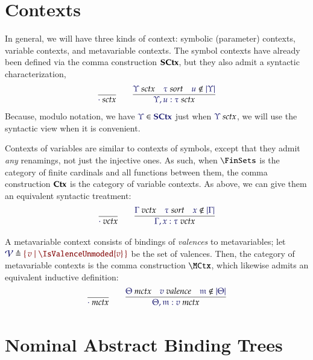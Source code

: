 \documentclass[11pt]{article}
\theoremstyle{definition}
\theoremstyle{remark}
\numberwithin{equation}{section}
\begin{document}
\section{Contexts}

In general, we will have three kinds of context: symbolic (parameter) contexts,
variable contexts, and metavariable contexts. The symbol contexts have already
been defined via the comma construction $\mathbf{SCtx}$, but they also admit a
syntactic characterization,
\begin{gather*}
  \infer{
    \IsSymCtx{\cdot}
  }{
  }
\qquad
  \infer{
    \IsSymCtx{\Upsilon,u:\tau}
  }{
    \IsSymCtx{\Upsilon}
&
    \IsSort{\tau}
&
    \NotIn{u}{\Dom\Upsilon}
  }
\end{gather*}
%
Because, modulo notation, we have $\Member{\Upsilon}{\SCtx}$ just when
$\IsSymCtx{\Upsilon}$, we will use the syntactic view when it is convenient.

Contexts of variables are similar to contexts of symbols, except that they
admit \emph{any} renamings, not just the injective ones. As such, when
$\FinSets$ is the category of finite cardinals and all functions between them, the
comma construction $\mathbf{Ctx}$ is the category of variable contexts. As above, we
can give them an equivalent syntactic treatment:
\begin{gather*}
  \infer{
    \IsVarCtx{\cdot}
  }{
  }
\qquad
  \infer{
    \IsVarCtx{\Gamma,x:\tau}
  }{
    \IsVarCtx{\Gamma}
&
    \IsSort{\tau}
&
    \NotIn{x}{\Dom\Gamma}
  }
\end{gather*}

A metavariable context consists of bindings of \emph{valences} to
metavariables; let $\Define{\Valences}{\MkSet{v\mid \IsValenceUnmoded{v}}}$ be the set
of valences. Then, the category of metavariable contexts is the comma
construction $\MCtx$, which likewise admits an equivalent inductive definition:
\begin{gather*}
  \infer{
    \IsMetaCtx{\cdot}
  }{
  }
\qquad
  \infer{
    \IsMetaCtx{\Theta,\MV{m}:v}
  }{
    \IsMetaCtx{\Theta}
&
    \IsValence{v}
&
    \NotIn{\MV{m}}{\Dom\Theta}
  }
\end{gather*}



\section{Nominal Abstract Binding Trees}
\end{document}
